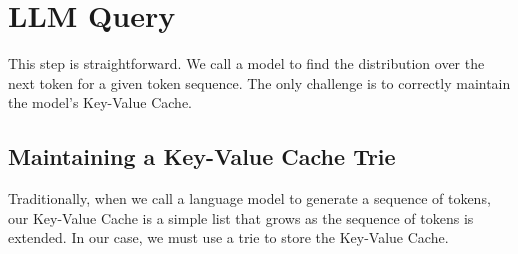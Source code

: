 \chapter{LLM Query}
\label{chap:llm-query}

This step is straightforward. We call a model to find the distribution over the next token
for a given token sequence. The only challenge is to correctly maintain the model's Key-Value Cache.

\section{Maintaining a Key-Value Cache Trie}
\label{sec:kv-cache-trie}
Traditionally, when we call a language model to generate a sequence of tokens,
our Key-Value Cache is a simple list that grows as the sequence of tokens is extended.
In our case, we must use a trie to store the Key-Value Cache.